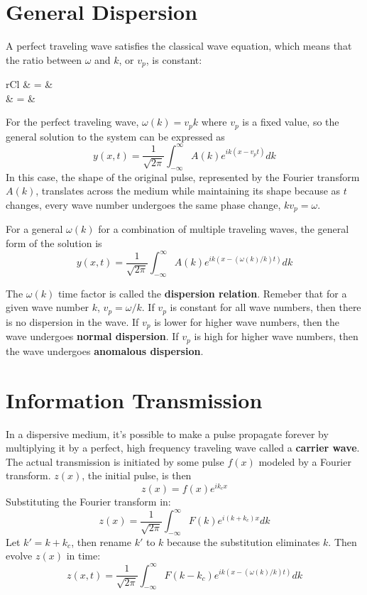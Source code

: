 \documentclass[11pt]{article}
\begin{document}
\section{General Dispersion}
A perfect traveling wave satisfies the classical wave equation, which means that the ratio between $\omega$ and $k$, or $v_p$, is constant:
	\begin{IEEEeqnarray}{rCl}
		 & = & \alpha {}\\
		 & = & 
	\end{IEEEeqnarray}
	
For the perfect traveling wave, $\omega(k) = v_p k$ where $v_p$ is a fixed value, so the general solution to the system can be expressed as
	\begin{equation}
		y(x, t) = \frac{1}{\sqrt{2\pi}} \int_{-\infty}^\infty A(k)e^{ik(x-v_p t)}dk
	\end{equation}
In this case, the shape of the original pulse, represented by the Fourier transform $A(k)$, translates across the medium while maintaining its shape because as $t$ changes, every wave number undergoes the same phase change, $kv_p = \omega$.

	For a general $\omega(k)$ for a combination of multiple traveling waves, the general form of the solution is
	\begin{equation}
		y(x, t) = \frac{1}{\sqrt{2\pi}} \int_{-\infty}^\infty A(k)e^{ik(x-(\omega(k)/k) t)}dk
	\end{equation}
	
	The $\omega(k)$ time factor is called the \textbf{dispersion relation}. Remeber that for a given wave number $k$, $v_p = \omega/k$. If $v_p$ is constant for all wave numbers, then there is no dispersion in the wave. If $v_p$ is lower for higher wave numbers, then the wave undergoes \textbf{normal dispersion}. If $v_p$ is high for higher wave numbers, then the wave undergoes \textbf{anomalous dispersion}.
	
\section{Information Transmission}
	In a dispersive medium, it's possible to make a pulse propagate forever by multiplying it by a perfect, high frequency traveling wave called a \textbf{carrier wave}. The actual transmission is initiated by some pulse $f(x)$ modeled by a Fourier transform. $z(x)$, the initial pulse, is then
	\begin{equation}
		z(x) = f(x)e^{ik_c x}
	\end{equation}
	Substituting the Fourier transform in:
	\begin{equation}
		z(x) = \frac{1}{\sqrt{2\pi}} \int_{-\infty}^\infty F(k)e^{i(k + k_c)x}dk
	\end{equation}
	Let $k' = k+k_c$, then rename $k'$ to $k$ because the substitution eliminates $k$. Then evolve $z(x)$ in time:
	\begin{equation}
		z(x, t) = \frac{1}{\sqrt{2\pi}} \int_{-\infty}^\infty F(k - k_c) e^{ik(x - (\omega(k)/k)t)}dk
	\end{equation}
	
\end{document}
